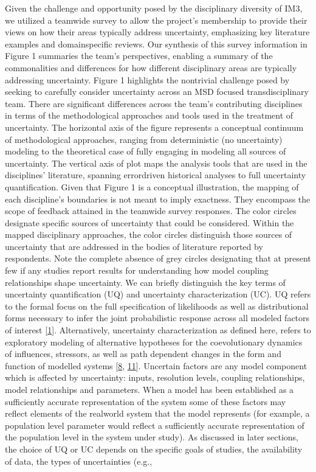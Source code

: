 \documentclass[letterpaper,10pt,english]{sphinxmanual}
\begin{document}
\sphinxAtStartPar
Given the challenge and opportunity posed by the disciplinary diversity of IM3, we utilized a team\sphinxhyphen{}wide survey to allow the project’s membership to provide their views on how their areas typically address uncertainty, emphasizing key literature examples and domain\sphinxhyphen{}specific reviews. Our synthesis of this survey information in Figure 1 summaries the team’s perspectives, enabling a summary of the commonalities and differences for how different disciplinary areas are typically addressing uncertainty. Figure 1 highlights the non\sphinxhyphen{}trivial challenge posed by seeking to carefully consider uncertainty across an MSD focused transdisciplinary team. There are significant differences across the team’s contributing disciplines in terms of the methodological approaches and tools used in the treatment of uncertainty. The horizontal axis of the figure represents a conceptual continuum of methodological approaches, ranging from deterministic (no uncertainty) modeling to the theoretical case of fully engaging in modeling all sources of uncertainty. The vertical axis of plot maps the analysis tools that are used in the disciplines’ literature, spanning error\sphinxhyphen{}driven historical analyses to full uncertainty quantification. Given that Figure 1 is a conceptual illustration, the mapping of each discipline’s boundaries is not meant to imply exactness. They encompass the scope of feedback attained in the team\sphinxhyphen{}wide survey responses. The color circles designate specific sources of uncertainty that could be considered. Within the mapped disciplinary approaches, the color circles distinguish those sources of uncertainty that are addressed in the bodies of literature reported by respondents. Note the complete absence of grey circles designating that at present few if any studies report results for understanding how model coupling relationships shape uncertainty. We can briefly distinguish the key terms of uncertainty quantification (UQ) and uncertainty characterization (UC). UQ refers to the formal focus on the full specification of likelihoods as well as distributional forms necessary to infer the joint  probabilistic response across all modeled factors of interest {[}\hyperlink{cite.index:id11}{1}{]}. Alternatively, uncertainty characterization as defined here, refers to exploratory modeling of alternative hypotheses for the co\sphinxhyphen{}evolutionary dynamics of influences, stressors, as well as path dependent changes in the form and function of modelled systems {[}\hyperlink{cite.index:id12}{8}, \hyperlink{cite.index:id13}{11}{]}. Uncertain factors are any model component which is affected by uncertainty: inputs, resolution levels, coupling relationships, model relationships and parameters. When a model has been established as a sufficiently accurate representation of the system some of these factors may reflect elements of the real\sphinxhyphen{}world system that the model represents (for example, a population level parameter would reflect a sufficiently accurate representation of the population level in the system under study). As discussed in later sections, the choice of UQ or UC depends on the specific goals of studies, the availability of data, the types of uncertainties (e.g., 
\end{document}
